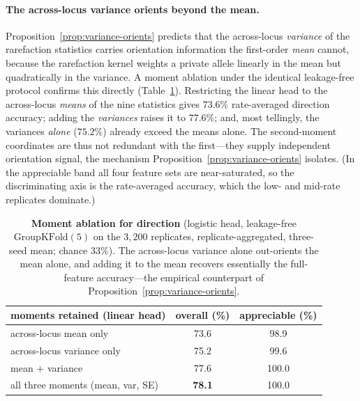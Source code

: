 \documentclass[11pt]{article}
\theoremstyle{plain}
\theoremstyle{definition}
\theoremstyle{remark}
\begin{document}
\paragraph{The across-locus variance orients beyond the mean.}
Proposition~\ref{prop:variance-orients} predicts that the across-locus \emph{variance} of the
rarefaction statistics carries orientation information the first-order \emph{mean} cannot, because
the rarefaction kernel weights a private allele linearly in the mean but quadratically in the
variance. A moment ablation under the identical leakage-free protocol confirms this directly
(Table~\ref{tab:moments}). Restricting the linear head to the across-locus \emph{means} of the nine
statistics gives $73.6\%$ rate-averaged direction accuracy; adding the \emph{variances} raises it to
$77.6\%$; and, most tellingly, the variances \emph{alone} ($75.2\%$) already exceed the means alone.
The second-moment coordinates are thus not redundant with the first---they supply independent
orientation signal, the mechanism Proposition~\ref{prop:variance-orients} isolates. (In the
appreciable band all four feature sets are near-saturated, so the discriminating axis is the
rate-averaged accuracy, which the low- and mid-rate replicates dominate.)

\begin{table}[H]
\centering
\scriptsize
\begin{tabular}{lcc}
\toprule
moments retained (linear head) & overall (\%) & appreciable (\%) \\
\midrule
across-locus mean only            & 73.6 & 98.9 \\
across-locus variance only        & 75.2 & 99.6 \\
mean $+$ variance                 & 77.6 & 100.0 \\
all three moments (mean, var, SE) & \textbf{78.1} & 100.0 \\
\bottomrule
\end{tabular}
\caption{\textbf{Moment ablation for direction} (logistic head, leakage-free
$\mathrm{GroupKFold}(5)$ on the $3{,}200$ replicates, replicate-aggregated, three-seed mean; chance
$33\%$). The across-locus variance alone out-orients the mean alone, and adding it to the mean
recovers essentially the full-feature accuracy---the empirical counterpart of
Proposition~\ref{prop:variance-orients}.}
\label{tab:moments}
\end{table}
\end{document}
